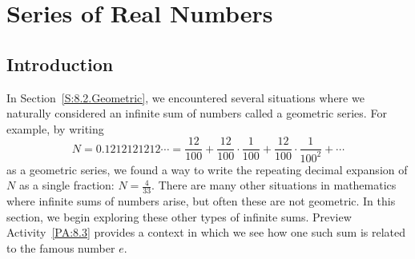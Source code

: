 \section{Series of Real Numbers} \label{S:8.3.Series}

\vspace*{-14 pt}

\subsection*{Introduction}

In Section~\ref{S:8.2.Geometric}, we encountered several situations where we naturally considered an infinite sum of numbers called a geometric series.  For example, by writing
$$N = 0.1212121212 \cdots = \frac{12}{100} + \frac{12}{100} \cdot \frac{1}{100} + \frac{12}{100} \cdot \frac{1}{100^2} + \cdots$$
as a geometric series, we found a way to write the repeating decimal expansion of $N$ as a single fraction: $N = \frac{4}{33}$.  There are many other situations in mathematics where infinite sums of numbers arise, but often these are not geometric.  In this section, we begin exploring these other types of infinite sums.  Preview Activity~\ref{PA:8.3} provides a context in which we see how one such sum is related to the famous number $e$.



